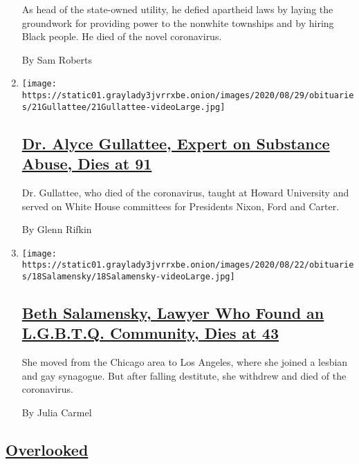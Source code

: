 \begin{enumerate}
  As head of the state-owned utility, he defied apartheid laws by laying
  the groundwork for providing power to the nonwhite townships and by
  hiring Black people. He died of the novel coronavirus.

  By Sam Roberts
\item
  \texttt{[image: https://static01.graylady3jvrrxbe.onion/images/2020/08/29/obituaries/21Gullattee/21Gullattee-videoLarge.jpg]}

  \hypertarget{dr-alyce-gullattee-expert-on-substance-abuse-dies-at-91}{%
  \subsection{\texorpdfstring{\href{/2020/08/23/obituaries/dr-alyce-gullattee-dead-coronavirus.html}{Dr.
  Alyce Gullattee, Expert on Substance Abuse, Dies at
  91}}{Dr. Alyce Gullattee, Expert on Substance Abuse, Dies at 91}}\label{dr-alyce-gullattee-expert-on-substance-abuse-dies-at-91}}

  Dr. Gullattee, who died of the coronavirus, taught at Howard
  University and served on White House committees for Presidents Nixon,
  Ford and Carter.

  By Glenn Rifkin
\item
  \texttt{[image: https://static01.graylady3jvrrxbe.onion/images/2020/08/22/obituaries/18Salamensky/18Salamensky-videoLarge.jpg]}

  \hypertarget{beth-salamensky-lawyer-who-found-an-lgbtq-community-dies-at-43}{%
  \subsection{\texorpdfstring{\href{/2020/08/20/obituaries/beth-salamensky-dead-coronavirus.html}{Beth
  Salamensky, Lawyer Who Found an L.G.B.T.Q. Community, Dies at
  43}}{Beth Salamensky, Lawyer Who Found an L.G.B.T.Q. Community, Dies at 43}}\label{beth-salamensky-lawyer-who-found-an-lgbtq-community-dies-at-43}}

  She moved from the Chicago area to Los Angeles, where she joined a
  lesbian and gay synagogue. But after falling destitute, she withdrew
  and died of the coronavirus.

  By Julia Carmel
\end{enumerate}

\hypertarget{overlooked}{%
\subsection{\texorpdfstring{\href{/spotlight/overlooked}{Overlooked}}{Overlooked}}\label{overlooked}}

